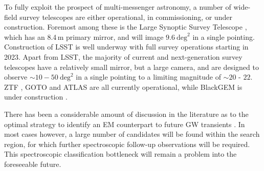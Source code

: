 \documentclass{aa}
\begin{document}

To fully exploit the prospect of multi-messenger astronomy, a number of wide-field survey telescopes are either operational, in commissioning, or under construction. Foremost among these is the Large Synoptic Survey Telescope \citep[LSST;][]{LSSTbook}, which has an 8.4\,m primary mirror, and will image $9.6~\mathrm{deg}^2$ in a single pointing. Construction of LSST is well underway
with full survey operations starting in 2023.
Apart from LSST, the majority of current and next-generation survey telescopes have a relatively small mirror, but a large camera, and are designed to observe $\sim10-50~\mathrm{deg}^2$ in a single pointing to a limiting magnitude of $\sim20$ - $22$. ZTF \citep{ZTF}, GOTO \citep{GOTO} and ATLAS \citep{ATLAS} are all currently operational, while BlackGEM is under construction \citep{BlackGEM}.

There has been a considerable amount of discussion in the literature as to the optimal strategy to identify an EM counterpart to future GW transients \citep{2016ApJ...820..136G, 2011MNRAS.415L..26C, 2016A&A...592A..82G, 2017ApJ...834...84C, 2014MNRAS.437..649S, 2016MNRAS.462.1085A, 2018arXiv181204051M}. In most cases however, a large number of candidates will be found within the search region, for which further spectroscopic follow-up observations will be required. This spectroscopic classification bottleneck will remain a problem into the foreseeable future.

\end{document}
